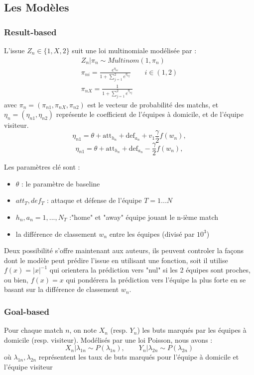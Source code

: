 \documentclass[11pt, a4paper]{article}
\begin{document}
\subsection{Les Modèles}
\subsubsection{Result-based}
L'issue $Z_n \in \{ 1,X,2\}$ suit une loi multinomiale modélisée par : 
\begin{eqnarray*}
Z_n |\pi_n \sim Multinom(1,\pi_n) \\
\pi_{ni}=\frac{e^{\eta_{ni}}}{1+\sum_{j=1}^{2}e^{\eta_{nj}}} \qquad  i \in (1,2)\\
\pi_{nX}=\frac{1}{1+\sum_{j=1}^{2}e^{\eta_{nj}}}
\end{eqnarray*}
avec $\pi_n = (\pi_{n1},\pi_{nX},\pi_{n2})$ est le vecteur de probabilité des matchs, 
et $\eta_n = (\eta_{n1}, \eta_{n2}) $ représente le coefficient de l'équipes à domicile, 
et de l'équipe visiteur.
\begin{equation}
    \eta_{n1} = \theta + \text{att}_{h_n} + \text{def}_{a_n} + v_1 \frac{\gamma}{2} f(w_n),
\end{equation}
\begin{equation}
    \eta_{n1} = \theta + \text{att}_{h_n} + \text{def}_{a_n} - \frac{\gamma}{2} f(w_n),
\end{equation}

Les paramètres clé sont :
\begin{itemize}
    \item $\theta$ : le paramètre de baseline 
    \item $att_T, def_T$ : attaque et défense de l'équipe $T=1...N$
    \item  $h_n, a_n = 1, ..., N_T$ :"home" et "away" équipe jouant le n-ième match
    \item la différence de classement $w_n$ entre les équipes (divisé par $10^3$)
\end{itemize}
Deux possibilité s'offre maintenant aux auteurs, ils peuvent controler la façons dont 
le modèle peut prédire l'issue en utilisant une fonction, soit il utilise 
$f(x)=|x|^{-1}$ qui orientera la prédiction vers "nul" si les 2 équipes sont proches, 
ou bien, $f(x)=x$ qui pondérera la prédiction vers l'équipe la plus forte en se basant 
sur la différence de classement $w_n$.

\subsubsection{Goal-based}
Pour chaque match $n$, on note $X_n$ (resp. $Y_n$) les buts marqués par les équipes à 
domicile (resp. visiteur). Modélisés par une loi Poisson, nous avons :
$$ X_n|\lambda_{1n} \sim P(\lambda_{1n}), \qquad Y_n|\lambda_{2n} \sim P(\lambda_{2n}) $$
où $\lambda_{1n},\lambda_{2n}$ représentent les taux de buts marqués pour l'équipe à 
domicile et l'équipe visiteur
\end{document}

